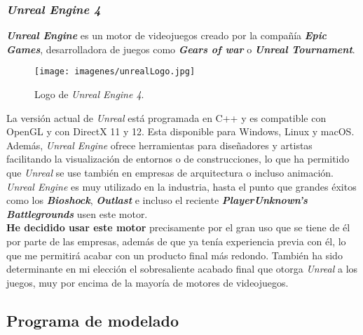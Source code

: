 \subsubsection{\textit{Unreal Engine 4}}
	
\textbf{\textit{Unreal Engine}} es un motor de videojuegos creado por la compañía \textbf{\textit{Epic Games}}, desarrolladora de juegos como \textbf{\textit{Gears of war}} o \textbf{\textit{Unreal Tournament}}.
\\


\begin{wrapfigure}{i}{0.6\textwidth}
	\vspace{-30pt}
	\begin{center}
		\vspace{-10pt}
		\texttt{[image: imagenes/unrealLogo.jpg]}
		\caption{Logo de \textit{Unreal Engine 4}.}
	\vspace{-10pt}
	\end{center}
	\vspace{-30pt}
\end{wrapfigure}

La versión actual de \textit{Unreal} está programada en C++ y es compatible con OpenGL y con DirectX 11 y 12. Esta disponible para Windows, Linux y macOS. Además, \textit{Unreal Engine} ofrece herramientas para diseñadores y artistas facilitando la visualización de entornos o de construcciones, lo que ha permitido que \textit{Unreal} se use también en empresas de arquitectura o incluso animación.
\\

\textit{Unreal Engine} es muy utilizado en la industria, hasta el punto que grandes éxitos como los \textit{\textbf{Bioshock}}, \textit{\textbf{Outlast}} e incluso el reciente \textit{\textbf{PlayerUnknown's Battlegrounds}} usen este motor.
\\

\textbf{He decidido usar este motor} precisamente por el gran uso que se tiene de él por parte de las empresas, además de que ya tenía experiencia previa con él, lo que me permitirá acabar con un producto final más redondo. También ha sido determinante en mi elección el sobresaliente acabado final que otorga \textit{Unreal} a los juegos, muy por encima de la mayoría de motores de videojuegos.
\\

\subsection{Programa de modelado}


